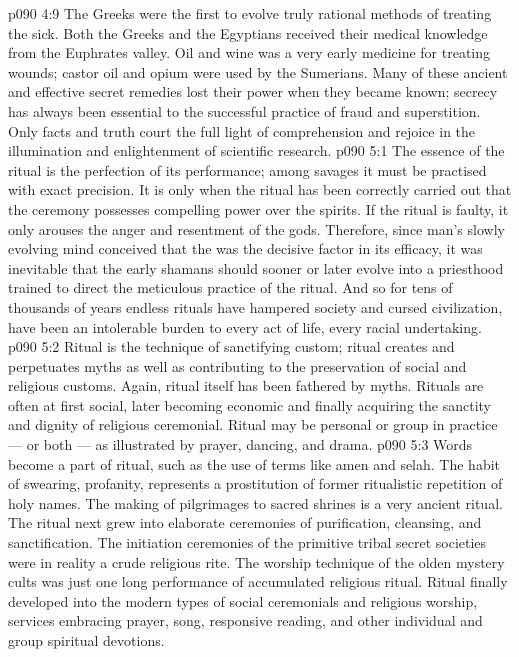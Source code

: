 \vs p090 4:9 The Greeks were the first to evolve truly rational methods of treating the sick. Both the Greeks and the Egyptians received their medical knowledge from the Euphrates valley. Oil and wine was a very early medicine for treating wounds; castor oil and opium were used by the Sumerians. Many of these ancient and effective secret remedies lost their power when they became known; secrecy has always been essential to the successful practice of fraud and superstition. Only facts and truth court the full light of comprehension and rejoice in the illumination and enlightenment of scientific research.
\vs p090 5:1 The essence of the ritual is the perfection of its performance; among savages it must be practised with exact precision. It is only when the ritual has been correctly carried out that the ceremony possesses compelling power over the spirits. If the ritual is faulty, it only arouses the anger and resentment of the gods. Therefore, since man’s slowly evolving mind conceived that the  was the decisive factor in its efficacy, it was inevitable that the early shamans should sooner or later evolve into a priesthood trained to direct the meticulous practice of the ritual. And so for tens of thousands of years endless rituals have hampered society and cursed civilization, have been an intolerable burden to every act of life, every racial undertaking.
\vs p090 5:2 Ritual is the technique of sanctifying custom; ritual creates and perpetuates myths as well as contributing to the preservation of social and religious customs. Again, ritual itself has been fathered by myths. Rituals are often at first social, later becoming economic and finally acquiring the sanctity and dignity of religious ceremonial. Ritual may be personal or group in practice --- or both --- as illustrated by prayer, dancing, and drama.
\vs p090 5:3 Words become a part of ritual, such as the use of terms like amen and selah. The habit of swearing, profanity, represents a prostitution of former ritualistic repetition of holy names. The making of pilgrimages to sacred shrines is a very ancient ritual. The ritual next grew into elaborate ceremonies of purification, cleansing, and sanctification. The initiation ceremonies of the primitive tribal secret societies were in reality a crude religious rite. The worship technique of the olden mystery cults was just one long performance of accumulated religious ritual. Ritual finally developed into the modern types of social ceremonials and religious worship, services embracing prayer, song, responsive reading, and other individual and group spiritual devotions.
